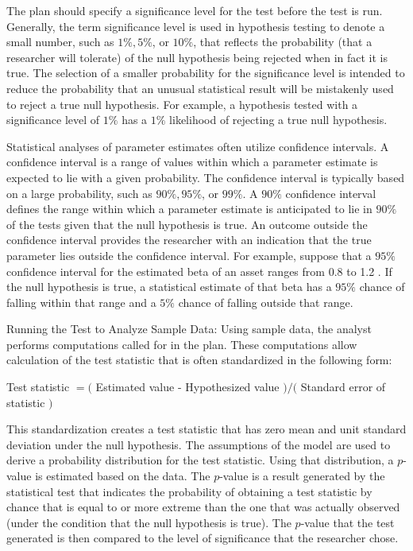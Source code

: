 \documentclass[11pt]{article}
\begin{document}
The plan should specify a significance level for the test before the test is run. Generally, the term significance level is used in hypothesis testing to denote a small number, such as $1 \%, 5 \%$, or $10 \%$, that reflects the probability (that a researcher will tolerate) of the null hypothesis being rejected when in fact it is true. The selection of a smaller probability for the significance level is intended to reduce the probability that an unusual statistical result will be mistakenly used to reject a true null hypothesis. For example, a hypothesis tested with a significance level of $1 \%$ has a $1 \%$ likelihood of rejecting a true null hypothesis.

Statistical analyses of parameter estimates often utilize confidence intervals. A confidence interval is a range of values within which a parameter estimate is expected to lie with a given probability. The confidence interval is typically based on a large probability, such as $90 \%, 95 \%$, or $99 \%$. A $90 \%$ confidence interval defines the range within which a parameter estimate is anticipated to lie in $90 \%$ of the tests given that the null hypothesis is true. An outcome outside the confidence interval provides the researcher with an indication that the true parameter lies outside the confidence interval. For example, suppose that a $95 \%$ confidence interval for the estimated beta of an asset ranges from 0.8 to 1.2 . If the null hypothesis is true, a statistical estimate of that beta has a $95 \%$ chance of falling within that range and a $5 \%$ chance of falling outside that range.

Running the Test to Analyze Sample Data: Using sample data, the analyst performs computations called for in the plan. These computations allow calculation of the test statistic that is often standardized in the following form:

Test statistic $=($ Estimated value - Hypothesized value $) /($ Standard error of statistic $)$

This standardization creates a test statistic that has zero mean and unit standard deviation under the null hypothesis. The assumptions of the model are used to derive a probability distribution for the test statistic. Using that distribution, a $p$-value is estimated based on the data. The $p$-value is a result generated by the\\
statistical test that indicates the probability of obtaining a test statistic by chance that is equal to or more extreme than the one that was actually observed (under the condition that the null hypothesis is true). The $p$-value that the test generated is then compared to the level of significance that the researcher chose.
\end{document}

